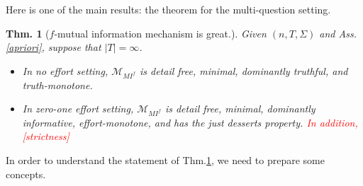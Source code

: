 \documentclass[11pt,a4paper,dvipdfmx]{article}
\theoremstyle{plain}
\newtheorem{thm}{Thm.}[section]
\newcommand{\mM}{\mathcal{M}}
\newcommand{\1}{\mathbbm{1}}
\newcommand{\ocomment}[1]{{\textcolor{red}{#1}}}
\begin{document}
Here is one of the main results: the theorem for the multi-question setting.
\begin{screen}
\begin{thm}[$f$-mutual information mechanism is great.] \label{thm-multi}
	Given $(n, T, \Sigma)$ and Ass.\ref{apriori}, suppose that $|T| = \infty$.
	\begin{itemize}
		\item In no effort setting, $\mM_{MI^f}$ is detail free, minimal, dominantly truthful, and truth-monotone.
		\item In zero-one effort setting, $\mM_{MI^f}$ is detail free, minimal, dominantly informative, effort-monotone, and has the just desserts property. \ocomment{In addition, [strictness]}
	\end{itemize}
\end{thm}	
\end{screen}



In order to understand the statement of Thm.\ref{thm-multi}, we need to prepare some concepts.
\end{document}
